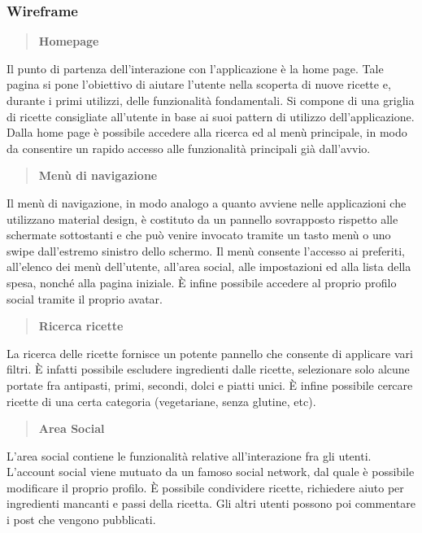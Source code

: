 \subsubsection{Wireframe}

\begin{quote}
 \textbf{Homepage}
\end{quote}
Il punto di partenza dell'interazione con l'applicazione è la home page. Tale pagina
si pone l'obiettivo di aiutare l'utente nella scoperta di nuove ricette e, durante
i primi utilizzi, delle funzionalità fondamentali. Si compone di una griglia di ricette
consigliate all'utente in base ai suoi pattern di utilizzo dell'applicazione.
Dalla home page è possibile accedere alla ricerca ed al menù principale, in modo da consentire
un rapido accesso alle funzionalità principali già dall'avvio.

\begin{quote}
 \textbf{Menù di navigazione}
\end{quote}
Il menù di navigazione, in modo analogo a quanto avviene nelle applicazioni che utilizzano material design, 
è costituto da un pannello sovrapposto rispetto alle schermate sottostanti e che può venire invocato tramite
un tasto menù o uno swipe dall'estremo sinistro dello schermo. Il menù consente l'accesso ai preferiti, all'elenco dei
menù dell'utente, all'area social, alle impostazioni ed alla lista della spesa, nonché alla pagina iniziale. È infine
possibile accedere al proprio profilo social tramite il proprio avatar.

\begin{quote}
 \textbf{Ricerca ricette}
\end{quote}
La ricerca delle ricette fornisce un potente pannello che consente di applicare vari filtri.
È infatti possibile escludere ingredienti dalle ricette, selezionare solo alcune portate fra antipasti, primi, 
secondi, dolci e piatti unici. È infine possibile cercare ricette di una certa categoria (vegetariane, senza glutine, etc).

\begin{quote}
 \textbf{Area Social}
\end{quote}
L'area social contiene le funzionalità relative all'interazione fra gli utenti. L'account social viene
mutuato da un famoso social network, dal quale è possibile modificare il proprio profilo.
È possibile condividere ricette, richiedere aiuto per ingredienti mancanti e passi
della ricetta. Gli altri utenti possono poi commentare i post che vengono pubblicati.

